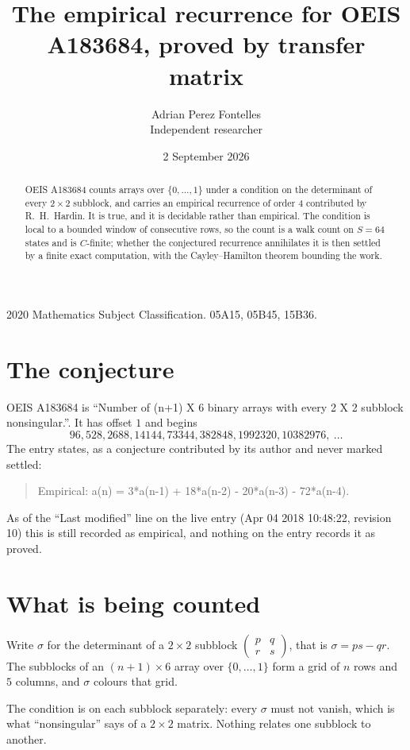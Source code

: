 \documentclass[11pt,a4paper]{article}
\title{The empirical recurrence for OEIS A183684, proved by transfer matrix}
\author{Adrian Perez Fontelles\\ \small Independent researcher}
\date{2 September 2026}
\theoremstyle{plain}
\theoremstyle{definition}
\begin{document}
\maketitle

\begin{abstract}
OEIS A183684 counts arrays over $\{0,\dots,1\}$ under a condition on the determinant of every
$2\times2$ subblock, and carries an empirical recurrence of order $4$ contributed by
R.~H.~Hardin. It is true, and it is decidable rather than empirical. The condition is local to
a bounded window of consecutive rows, so the count is a walk count on $S=64$ states and is
$C$-finite; whether the conjectured recurrence annihilates it is then settled by a finite exact
computation, with the Cayley--Hamilton theorem bounding the work.
\end{abstract}

\noindent\small 2020 Mathematics Subject Classification. 05A15, 05B45, 15B36.\normalsize

\section{The conjecture}

OEIS A183684 is ``Number of (n+1) X 6 binary arrays with every 2 X 2 subblock nonsingular.''. It has offset $1$ and begins
\[
96, 528, 2688, 14144, 73344, 382848, 1992320, 10382976,\ \dots
\]
The entry states, as a conjecture contributed by its author and never marked settled:
\begin{quote}
Empirical: a(n) = 3*a(n-1) + 18*a(n-2) - 20*a(n-3) - 72*a(n-4).
\end{quote}
As of the ``Last modified'' line on the live entry (Apr 04 2018 10:48:22, revision 10) this is still
recorded as empirical, and nothing on the entry records it as proved.

\section{What is being counted}

Write $\sigma$ for the determinant of a $2\times2$ subblock
$\begin{pmatrix}p&q\\r&s\end{pmatrix}$, that is $\sigma=ps-qr$. The subblocks of an
$(n+1)\times6$ array over $\{0,\dots,1\}$ form a grid of $n$ rows and $5$
columns, and $\sigma$ colours that grid.

The condition is on each subblock separately: every $\sigma$ must not vanish, which is what
``nonsingular'' says of a $2\times2$ matrix. Nothing
relates one subblock to another.
\end{document}
